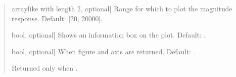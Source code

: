 \documentclass[letterpaper,10pt,english]{sphinxmanual}
\begin{document}
\begin{fulllineitems}
\begin{fulllineitems}
\begin{quote}
\begin{description}
\begin{description}
\sphinxlineitem{\sphinxstylestrong{range\_hz}}{[}array\sphinxhyphen{}like with length 2, optional{]}
\sphinxAtStartPar
Range for which to plot the magnitude response.
Default: {[}20, 20000{]}.

\sphinxlineitem{\sphinxstylestrong{show\_info\_box}}{[}bool, optional{]}
\sphinxAtStartPar
Shows an information box on the plot. Default: .

\sphinxlineitem{\sphinxstylestrong{returns}}{[}bool, optional{]}
\sphinxAtStartPar
When  figure and axis are returned. Default: .

\end{description}

\begin{description}
\sphinxAtStartPar
Returned only when .

\end{description}

\end{description}\end{quote}

\end{fulllineitems}



\end{fulllineitems}
\end{document}
